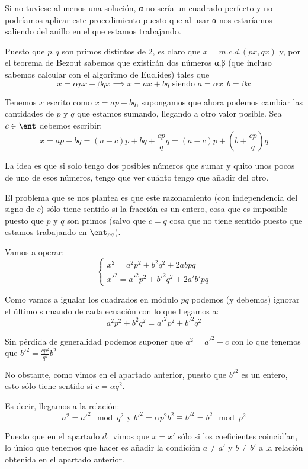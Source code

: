 \begin{problem}[7]
Si no tuviese al menos una solución, α no sería un cuadrado perfecto y no podríamos aplicar este procedimiento puesto que al usar α nos estaríamos saliendo del anillo en el que estamos trabajando.

\spart

\spart[$d_1$]

Puesto que $p,q$ son primos distintos de 2, es claro que $x=m.c.d.(px,qx)$ y, por el teorema de Bezout sabemos que existirán dos números α,β (que incluso sabemos calcular con el algoritmo de Euclides) tales que
\[x = αpx + βqx \implies x = ax+bq \text{ siendo } a = αx \ \ b=βx\]

Tenemos $x$ escrito como $x=ap+bq$, supongamos que ahora podemos cambiar las cantidades de $p$ y $q$ que estamos sumando, llegando a otro valor posible. Sea $c \in \ent$ debemos escribir:
\[x=ap+bq = (a-c)p+bq+\frac{cp}{q}q = (a-c)p+\left( b+\frac{cp}{q}\right)q\]

La idea es que si solo tengo dos posibles números que sumar y quito unos pocos de uno de esos números, tengo que ver cuánto tengo que añadir del otro.

El problema que se nos plantea es que este razonamiento (con independencia del signo de $c$) sólo tiene sentido si la fracción es un entero, cosa que es imposible puesto que $p$ y $q$ son primos (salvo que $c=q$ cosa que no tiene sentido puesto que estamos trabajando en $\ent_{pq}$).

\spart[$d_2$]

Vamos a operar:
\[\left\{ \begin{array}{l}x^2=a^2p^2+b^2q^2+2abpq \\  x'^2=a'^2p^2+b'^2q^2+2a'b'pq\end{array}\right.\]


Como vamos a igualar los cuadrados en módulo $pq$ podemos (y debemos) ignorar el último sumando de cada ecuación con lo que llegamos a:
\[a^2p^2+b^2q^2 = a'^2p^2+b'^2q^2\]

Sin pérdida de generalidad podemos suponer que $a^2=a'^2+c$ con lo que tenemos que $b'^2=\frac{cp^2}{q^2}b^2$

No obstante, como vimos en el apartado anterior, puesto que $b'^2$ es un entero, esto sólo tiene sentido si $c=αq^2$.

Es decir, llegamos a la relación:
\[a^2 = a'^2 \mod q^2 \text{ y } b'^2=αp^2b^2 \equiv b'^2 = b^2 \mod p^2\]

\spart[$d_3$]

Puesto que en el apartado $d_1$ vimos que $x=x'$ sólo si los coeficientes coincidían, lo único que tenemos que hacer es añadir la condición $a\neq a'$ y $b\neq b'$ a la relación obtenida en el apartado anterior.


\end{problem}
